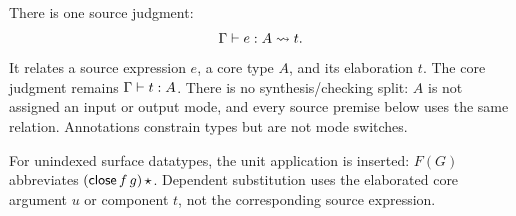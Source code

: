 \newpage
{}
There is one source judgment:
\[
 \Gamma\vdash e:A\rightsquigarrow t.
\]
It relates a source expression $e$, a core type $A$, and its elaboration $t$.
The core judgment remains $\Gamma\vdash t:A$. There is no synthesis/checking split:
$A$ is not assigned an input or output mode, and every source premise below
uses the same relation. Annotations constrain types but are not mode switches.
For unindexed surface datatypes, the unit application is inserted:
$F(G)$ abbreviates $(\mathsf{close}\,f\,g)\,\star$.
Dependent substitution uses the elaborated core argument $u$ or component
$t$, not the corresponding source expression.

